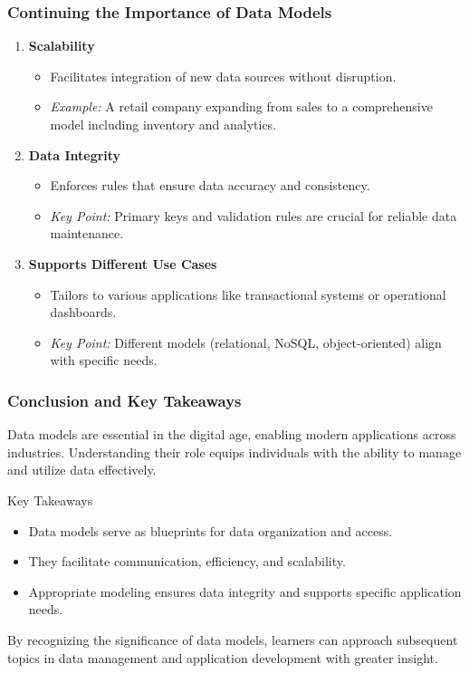 \documentclass[aspectratio=169]{beamer}
\begin{document}
\begin{frame}[fragile]
    \frametitle{Continuing the Importance of Data Models}
    \begin{enumerate}[resume]
        \item \textbf{Scalability}
            \begin{itemize}
                \item Facilitates integration of new data sources without disruption.
                \item \textit{Example:} A retail company expanding from sales to a comprehensive model including inventory and analytics.
            \end{itemize}

        \item \textbf{Data Integrity}
            \begin{itemize}
                \item Enforces rules that ensure data accuracy and consistency.
                \item \textit{Key Point:} Primary keys and validation rules are crucial for reliable data maintenance.
            \end{itemize}

        \item \textbf{Supports Different Use Cases}
            \begin{itemize}
                \item Tailors to various applications like transactional systems or operational dashboards.
                \item \textit{Key Point:} Different models (relational, NoSQL, object-oriented) align with specific needs.
            \end{itemize}
    \end{enumerate}
\end{frame}

\begin{frame}[fragile]
    \frametitle{Conclusion and Key Takeaways}
    Data models are essential in the digital age, enabling modern applications across industries. Understanding their role equips individuals with the ability to manage and utilize data effectively.

    \begin{block}{Key Takeaways}
        \begin{itemize}
            \item Data models serve as blueprints for data organization and access.
            \item They facilitate communication, efficiency, and scalability.
            \item Appropriate modeling ensures data integrity and supports specific application needs.
        \end{itemize}
    \end{block}

    By recognizing the significance of data models, learners can approach subsequent topics in data management and application development with greater insight.
\end{frame}
\end{document}
